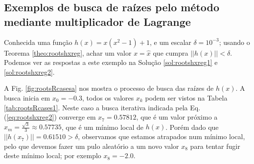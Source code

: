 \subsection{Exemplos de busca de raízes pelo método mediante multiplicador de Lagrange}


\begin{example}\label{ex:rootshxreg1}
Conhecida uma função $h(x)=x(x^2-1)+1$, e um escalar $\delta=10^{-3}$; usando o Teorema \ref{theo:rootshxreg},
achar um valor $x=\hat{x}$ que cumpra $||h(x)||<\delta$.
Podemos ver as respostas a este exemplo na Solução \ref{sol:rootshxreg1} e \ref{sol:rootshxreg2}.
\end{example}
\begin{SolutionT}\label{sol:rootshxreg1}
 A Fig. \ref{fig:rootsRcasesa} nos mostra o processo de busca das raízes de $h(x)$. 
A busca inicia em $x_0=-0.3$, 
todos os valores $x_{k}$ podem ser vistos na
Tabela \ref{tab:rootsRcases1}. 
Neste caso a busca iterativa indicada pela Eq. (\ref{eq:rootshxreg2}) 
converge em $x_7=0.57812$, que é um valor próximo a $x_m=\frac{\sqrt{3}}{3}\approx 0.57735$,
que é um mínimo local de $h(x)$.
Porém dado que $||h(x_7)||=0.61510 >\delta$, observamos que estamos atrapados num mínimo local,
pelo que devemos fazer um pulo aleatório a um novo valor $x_8$
para tentar fugir deste mínimo local; por exemplo $x_8=-2.0$.
\end{SolutionT}


